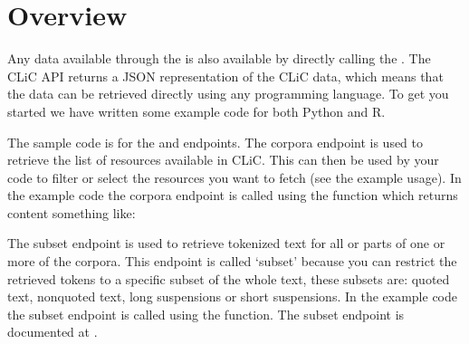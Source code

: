 \documentclass[letterpaper,10pt,english]{sphinxmanual}
\begin{document}
\section{Overview}
\label{\detokenize{advanced/api_usage:overview}}
\sphinxAtStartPar
Any data available through the 
is also available by directly calling the . The CLiC API
returns a JSON representation of the CLiC data, which means that the
data can be retrieved directly using any programming language. To get you
started we have written some example code for both Python and R.

\sphinxAtStartPar
The sample code is for the  and  endpoints. The corpora
endpoint is used to retrieve the list of resources available in CLiC.
This can then be used by your code to filter or select the resources you
want to fetch (see the example usage). In the example code the corpora
endpoint is called using the  function which returns
content something like:

\begin{sphinxVerbatim}[commandchars=\\\{\}]
 
                                               
                       
                              
                           
                                  
                         
                  
\end{sphinxVerbatim}

\sphinxAtStartPar
The subset endpoint is used to retrieve tokenized text for all or parts
of one or more of the corpora. This endpoint is called ‘subset’ because
you can restrict the retrieved tokens to a specific subset of the whole
text, these subsets are: quoted text, non\sphinxhyphen{}quoted text, long suspensions
or short suspensions. In the example code the subset endpoint is called
using the  function. The subset endpoint is documented
at .
\end{document}
